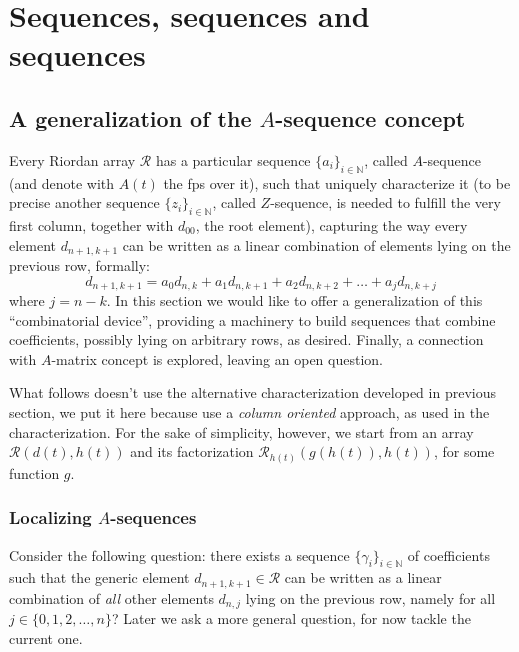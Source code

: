 

\section{Sequences, sequences and sequences}

\subsection{A generalization of the $A$-sequence concept}

Every Riordan array $\mathcal{R}$ has a particular sequence 
$\lbrace a_i\rbrace_{i\in\mathbb{N}}$,
called $A$-sequence (and denote with $A(t)$ the fps over it),
such that uniquely characterize it (to be precise another sequence
$\lbrace z_i\rbrace_{i\in\mathbb{N}}$, called $Z$-sequence, is needed 
to fulfill the very first column, together with $d_{00}$, the root element), 
capturing the way every element $d_{n+1,k+1}$ can be written as a linear combination
of elements lying on the previous row, formally:
\begin{displaymath}
    d_{n+1,k+1} = a_{0}d_{n,k} +a_{1}d_{n,k+1} +a_{2}d_{n,k+2} + 
        \ldots + a_{j}d_{n,k+j}
\end{displaymath}
where $j = n-k$. In this section we would like to offer a generalization
of this ``combinatorial device'', providing a machinery to build sequences 
that combine coefficients, possibly lying on arbitrary rows, as desired.
Finally, a connection with $A$-matrix concept is explored, leaving an open 
question.


What follows doesn't use the alternative characterization developed in 
previous section, we put it here because use a \emph{column oriented}
approach, as used in the characterization. For the sake of simplicity,
however, we start from an array $\mathcal{R}(d(t),h(t))$ and its 
factorization $\mathcal{R}_{h(t)}(g(h(t)), h(t))$, for some function $g$.

\subsubsection{Localizing $A$-sequences}

Consider the following question: there exists a sequence 
$\lbrace \gamma_{i} \rbrace_{i\in\mathbb{N}}$ of coefficients 
such that the generic element $d_{n+1,k+1}\in\mathcal{R}$ can be written
as a linear combination of \emph{all} other elements $d_{n,j}$ 
lying on the previous row, namely for all $j\in\lbrace0,1,2,\ldots,n\rbrace$? 
Later we ask a more general question, for now tackle the current one.

